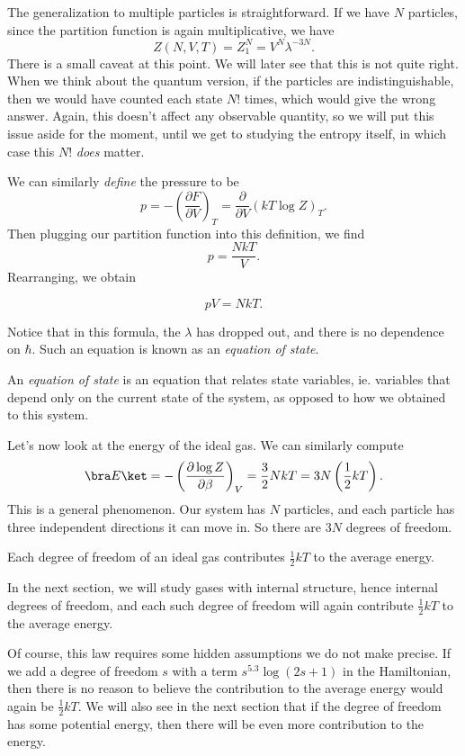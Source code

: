 \documentclass[a4paper]{article}
\begin{document}
The generalization to multiple particles is straightforward. If we have $N$ particles, since the partition function is again multiplicative, we have
\[
  Z(N, V, T) = Z_1^N = V^N \lambda^{-3N}.
\]
There is a small caveat at this point. We will later see that this is not quite right. When we think about the quantum version, if the particles are indistinguishable, then we would have counted each state $N!$ times, which would give the wrong answer. Again, this doesn't affect any observable quantity, so we will put this issue aside for the moment, until we get to studying the entropy itself, in which case this $N!$ \emph{does} matter.

We can similarly \emph{define} the pressure to be
\[
  p = - \left(\frac{\partial F}{\partial V}\right)_T = \frac{\partial}{\partial V} (k T \log Z)_T.
\]
Then plugging our partition function into this definition, we find
\[
  p = \frac{NkT}{V}.
\]
Rearranging, we obtain
\begin{prop}
  \[
    pV = NkT.
  \]
\end{prop}
Notice that in this formula, the $\lambda$ has dropped out, and there is no dependence on $\hbar$. Such an equation is known as an \emph{equation of state}.

\begin{defi}
  An \emph{equation of state} is an equation that relates state variables, ie. variables that depend only on the current state of the system, as opposed to how we obtained to this system.
\end{defi}

Let's now look at the energy of the ideal gas. We can similarly compute
\[
  \bra E\ket = - \left(\frac{\partial \log Z}{\partial \beta}\right)_V = \frac{3}{2} NkT = 3N \left(\frac{1}{2} kT\right).
\]
This is a general phenomenon. Our system has $N$ particles, and each particle has three independent directions it can move in. So there are $3N$ degrees of freedom.
\begin{law}
  Each degree of freedom of an ideal gas contributes $\frac{1}{2}kT$ to the average energy.
\end{law}
In the next section, we will study gases with internal structure, hence internal degrees of freedom, and each such degree of freedom will again contribute $\frac{1}{2}kT$ to the average energy.

Of course, this law requires some hidden assumptions we do not make precise. If we add a degree of freedom $s$ with a term $s^{5.3} \log (2s + 1)$ in the Hamiltonian, then there is no reason to believe the contribution to the average energy would again be $\frac{1}{2} kT$. We will also see in the next section that if the degree of freedom has some potential energy, then there will be even more contribution to the energy.
\end{document}
